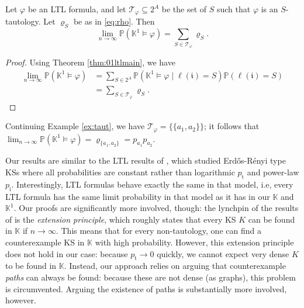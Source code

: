 \documentclass[runngingheads]{llncs}
\newcommand{\ini}{\mathfrak{i}}
\newcommand\recht\operatorname
\begin{document}
\begin{theorem} \label{thm:01ltlone}
Let $\varphi$ be an LTL formula, and let $\mathcal{T}_{\varphi} \subseteq 2^A$ be the set of $S$ such that $\varphi$ is an $S$-tautology. Let $\varrho_S$ be as in \eqref{eq:rho}. Then
\[
\lim_{n \rightarrow \infty} \mathbb{P}(\mathbb{K}^1 \models \varphi) = \sum_{S \in \mathcal{T}_{\varphi}} \varrho_S.
\]
\end{theorem}

\begin{proof}
Using Theorem \ref{thm:01ltlmain}, we have
\begin{align*}
\lim_{n \rightarrow \infty} \mathbb{P}(\mathbb{K}^1 \models \varphi) &= \sum_{S \in 2^A} \mathbb{P}(\mathbb{K}^1 \models \varphi \mid \ell(\ini) = S)\mathbb{P}(\ell(\ini) = S) \\
&= \sum_{S \in \mathcal{T}_{\varphi}} \varrho_S.
\end{align*}
\end{proof}

\begin{example}
Continuing Example \ref{ex:taut}, we have $\mathcal{T}_{\varphi} = \{\{a_1,a_2\}\}$; it follows that $\lim_{n \rightarrow \infty} \mathbb{P}(\mathbb{K}^1 \models \varphi) = \varrho_{\{a_1,a_2\}} = p_{a_1}p_{a_2}$.
\end{example}

\begin{remark}
Our results are similar to the LTL results of \cite{dong20250}, which studied Erd\H{o}s-Rényi type KSs where all probabilities are constant rather than logarithmic $p_{\recht{t}}$ and power-law $p_{\recht{i}}$. Interestingly, LTL formulas behave exactly the same in that model, i.e, every LTL formula has the same limit probability in that model as it has in our $\mathbb{K}$ and $\mathbb{K}^1$. Our proofs are significantly more involved, though: the lynchpin of the results of \cite{dong20250} is the \emph{extension principle}, which roughly states that every KS $K$ can be found in $\mathbb{K}$ if $n \rightarrow \infty$. This means that for every non-tautology, one can find a counterexample KS in $\mathbb{K}$ with high probability. However, this extension principle does not hold in our case: because $p_{\recht{t}} \rightarrow 0$ quickly, we cannot expect very dense $K$ to be found in $\mathbb{K}$. Instead, our approach relies on arguing that counterexample \emph{paths} can always be found: because these are not dense (as graphs), this problem is circumvented. Arguing the existence of paths is substantially more involved, however.
\end{remark}
\end{document}
